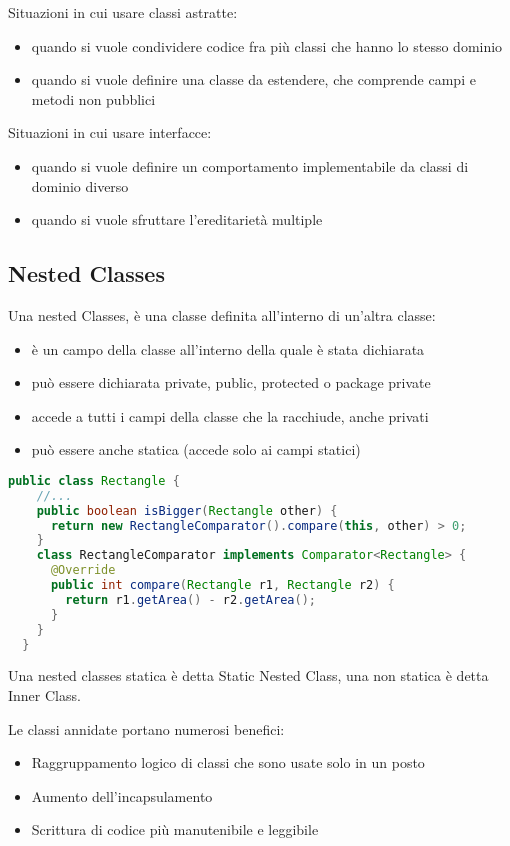 \documentclass[a4paper,12pt,twoside]{book}
\begin{document}
Situazioni in cui usare classi astratte:
\begin{itemize}
\item quando si vuole condividere codice fra più classi
  che hanno lo stesso dominio
\item quando si vuole definire una classe da estendere,
  che comprende campi e metodi non pubblici
\end{itemize}

Situazioni in cui usare interfacce:
\begin{itemize}
\item quando si vuole definire un comportamento
  implementabile da classi di dominio diverso
\item quando si vuole sfruttare l’ereditarietà multiple
\end{itemize}

\subsection{Nested Classes}

Una nested Classes, è una classe definita all’interno di un’altra
classe:
\begin{itemize}
\item è un campo della classe all’interno della quale
  è stata dichiarata
\item può essere dichiarata private, public, protected
  o package private
\item accede a tutti i campi della classe che la
  racchiude, anche privati
\item può essere anche statica (accede solo ai campi
  statici)
\end{itemize}

\begin{lstlisting}[caption={Nested Classes},
  label={lst:Nested},language=Java]
  public class Rectangle {
    //...
    public boolean isBigger(Rectangle other) {
      return new RectangleComparator().compare(this, other) > 0;
    }
    class RectangleComparator implements Comparator<Rectangle> {
      @Override
      public int compare(Rectangle r1, Rectangle r2) {
        return r1.getArea() - r2.getArea();
      }
    }
  }

\end{lstlisting}

Una nested classes statica è detta Static Nested Class, una non
statica è detta Inner Class.

Le classi annidate portano numerosi benefici:
\begin{itemize}
\item Raggruppamento logico di classi che sono
  usate solo in un posto
\item Aumento dell’incapsulamento
\item Scrittura di codice più manutenibile e
  leggibile
\end{itemize}
\end{document}
